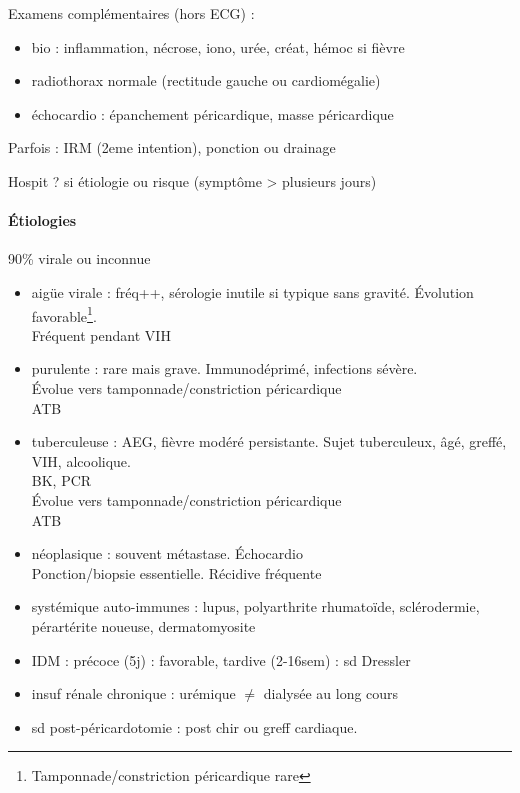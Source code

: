 Examens complémentaires (hors ECG) :
\begin{itemize}
  \item bio : inflammation, nécrose, iono, urée, créat, hémoc si fièvre
  \item radiothorax normale (rectitude gauche ou cardiomégalie)
  \item échocardio : épanchement péricardique, masse péricardique
\end{itemize}
Parfois : IRM (2eme intention), ponction ou drainage

Hospit ? si étiologie ou risque (symptôme > plusieurs jours)

\paragraph{Étiologies} 90\% virale ou inconnue
\begin{itemize}
  \item aigüe virale : fréq++, sérologie inutile si typique sans gravité.
    Évolution favorable\footnote{Tamponnade/constriction péricardique rare}.\\
    Fréquent pendant VIH
  \item purulente : rare mais grave. Immunodéprimé, infections sévère.\\
    Évolue vers tamponnade/constriction péricardique\\
    ATB
  \item tuberculeuse : AEG, fièvre modéré persistante. Sujet tuberculeux, âgé,
    greffé, VIH, alcoolique.\\
    BK, PCR\\
    Évolue vers tamponnade/constriction péricardique\\
    ATB
  \item néoplasique : souvent métastase. Échocardio\\
    Ponction/biopsie essentielle. Récidive fréquente
  \item systémique auto-immunes : lupus, polyarthrite rhumatoïde, sclérodermie,
    pérartérite noueuse, dermatomyosite
  \item IDM : précoce (5j) : favorable, tardive (2-16sem) : sd Dressler
  \item insuf rénale chronique : urémique $\ne$ dialysée au long cours
  \item sd post-péricardotomie : post chir ou greff cardiaque.
\end{itemize}

